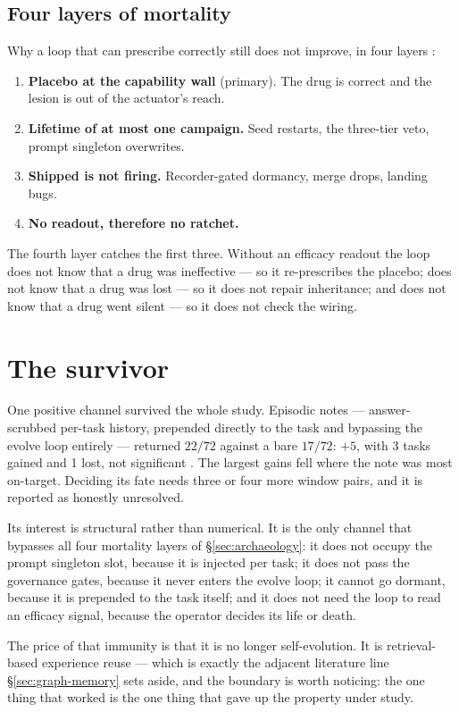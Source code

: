 \subsection*{Four layers of mortality} 

Why a loop that can prescribe correctly still does not improve, in four
layers :

\begin{enumerate}
  \item \textbf{Placebo at the capability wall} (primary). The drug is
        correct and the lesion is out of the actuator's reach.
  \item \textbf{Lifetime of at most one campaign.} Seed restarts, the
        three-tier veto, prompt singleton overwrites.
  \item \textbf{Shipped is not firing.} Recorder-gated dormancy, merge
        drops, landing bugs.
  \item \textbf{No readout, therefore no ratchet.}
\end{enumerate}

The fourth layer catches the first three. Without an efficacy readout the
loop does not know that a drug was ineffective --- so it re-prescribes the
placebo; does not know that a drug was lost --- so it does not repair
inheritance; and does not know that a drug went silent --- so it does not
check the wiring.

\section{The survivor}
\label{sec:survivor}

One positive channel survived the whole study. Episodic notes ---
answer-scrubbed per-task history, prepended directly to the task and
bypassing the evolve loop entirely --- returned $22/72$ against a bare
$17/72$: $+5$, with 3 tasks gained and 1 lost, not significant . The
largest gains fell where the note was most on-target. Deciding its fate
needs three or four more window pairs, and it is reported as honestly
unresolved.

Its interest is structural rather than numerical. It is the only channel
that bypasses all four mortality layers of \S\ref{sec:archaeology}: it does
not occupy the prompt singleton slot, because it is injected per task; it
does not pass the governance gates, because it never enters the evolve
loop; it cannot go dormant, because it is prepended to the task itself; and
it does not need the loop to read an efficacy signal, because the operator
decides its life or death.

The price of that immunity is that it is no longer self-evolution. It is
retrieval-based experience reuse --- which is exactly the adjacent
literature line \S\ref{sec:graph-memory} sets aside, and the boundary is
worth noticing: the one thing that worked is the one thing that gave up the
property under study.
